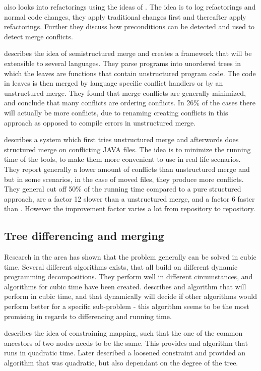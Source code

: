 \documentclass[11pt]{article}
\begin{document}
\citet{Ekman} also looks into refactorings using the ideas of \citet{Lippe}. The idea is to log refactorings and normal code changes, they apply traditional changes first and thereafter apply refactorings. Further they discuss how preconditions can be detected and used to detect merge conflicts.

\citet{Apel} describes the idea of semistructured merge and creates a framework that will be extensible to several languages. They parse programs into unordered trees in which the leaves are functions that contain unstructured program code. The code in leaves is then merged by language specific conflict handlers or by an unstructured merge. They found that merge conflicts are generally minimized, and conclude that many conflicts are ordering conflicts. In 26\% of the cases there will actually be more conflicts, due to renaming creating conflicts in this approach as opposed to compile errors in unstructured merge.

\citet{Olav} describes a system which first tries unstructured merge and afterwords does structured merge on conflicting JAVA files. The idea is to minimize the running time of the tools, to make them more convenient to use in real life scenarios. They report generally a lower amount of conflicts than unstructured merge and \citet{Apel} but in some scenarios, in the case of moved files, they produce more conflicts. They general cut off 50\% of the running time compared to a pure structured approach, are a factor 12 slower than a unstructured merge, and a factor 6 faster than \citet{Apel}. However the improvement factor varies a lot from repository to repository.  


\subsection{Tree differencing  and merging}
Research in the area has shown that the problem generally can be solved in cubic time. Several different algorithms exists, that all build on different dynamic programming decompositions. They perform well in different circumstances, and algorithms for cubic time have been created. \citet{Pawlik} describes and algorithm that will perform in cubic time, and that dynamically will decide if other algorithms would perform better for a specific sub-problem - this algorithm seems to be the most promising in regards to differencing and running time.

\citet{Zhang} describes the idea of constraining mapping, such that the one of the common ancestors of two nodes needs to be the same. This provides and algorithm that runs in quadratic time. Later \citet{Lu} described a loosened constraint and provided an algorithm that was quadratic, but also dependant on the degree of the tree.
\end{document}

